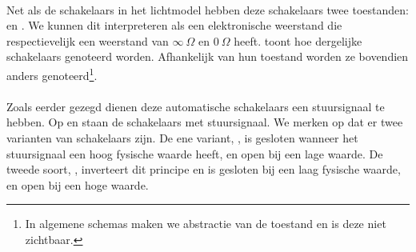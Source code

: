 \paragraph{}
Net als de schakelaars in het lichtmodel hebben deze schakelaars twee toestanden:  en . We kunnen dit interpreteren als een elektronische weerstand die respectievelijk een weerstand van $\infty\ \Omega$ en $0\ \Omega$ heeft.  toont hoe dergelijke schakelaars genoteerd worden. Afhankelijk van hun toestand worden ze bovendien anders genoteerd\footnote{In algemene schemas maken we abstractie van de toestand en is deze niet zichtbaar.}.

\paragraph{}
Zoals eerder gezegd dienen deze automatische schakelaars een stuursignaal te hebben. Op  en  staan de schakelaars met stuursignaal. We merken op dat er twee varianten van schakelaars zijn. De ene variant, , is gesloten wanneer het stuursignaal een hoog fysische waarde heeft, en open bij een lage waarde. De tweede soort, , inverteert dit principe en is gesloten bij een laag fysische waarde, en open bij een hoge waarde.

